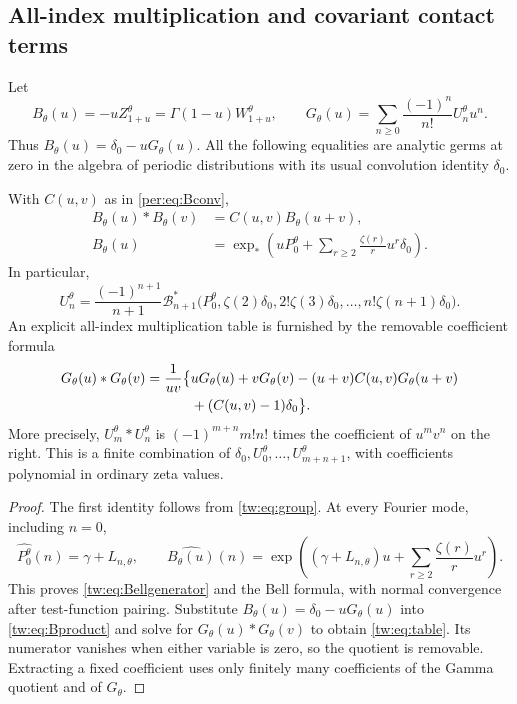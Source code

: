 \subsection{All-index multiplication and covariant contact terms}

Let
\begin{equation}\label{tw:eq:B}
 B_\theta(u)=-uZ_{1+u}^\theta
      =\Gamma(1-u)W_{1+u}^\theta,
 \qquad
 G_\theta(u)=\sum_{n\ge0}\frac{(-1)^n}{n!}U_n^\theta u^n.
\end{equation}
Thus $B_\theta(u)=\delta_0-uG_\theta(u)$. All the following
equalities are analytic germs at zero in the algebra of periodic
distributions with its usual convolution identity $\delta_0$.

\begin{theorem}
\label{tw:thm:normalform}
With $C(u,v)$ as in \eqref{per:eq:Bconv},
\begin{align}
 B_\theta(u)*B_\theta(v)&=C(u,v)B_\theta(u+v),
 \label{tw:eq:Bproduct}\\
 B_\theta(u)&=\exp_*\left(uP_0^\theta+
                \sum_{r\ge2}\frac{\zeta(r)}r u^r\delta_0\right).
 \label{tw:eq:Bellgenerator}
\end{align}
In particular,
\begin{equation}\label{tw:eq:Bell}
 U_n^\theta=\frac{(-1)^{n+1}}{n+1}
 \mathcal B_{n+1}^*
 \bigl(P_0^\theta,\zeta(2)\delta_0,2!\zeta(3)\delta_0,
                            \ldots,n!\zeta(n+1)\delta_0\bigr).
\end{equation}
An explicit all-index multiplication table is furnished by the
removable coefficient formula
\begin{align}
 G_\theta(u)*G_\theta(v)
 =\frac{1}{uv}\bigl\{&uG_\theta(u)+vG_\theta(v)
       -(u+v)C(u,v)G_\theta(u+v)\notag\\
       &+(C(u,v)-1)\delta_0\bigr\}.
 \label{tw:eq:table}
\end{align}
More precisely, $U_m^\theta*U_n^\theta$ is $(-1)^{m+n}m!n!$
times the coefficient of $u^mv^n$ on the right. This is a finite
combination of $\delta_0,U_0^\theta,\ldots,U_{m+n+1}^\theta$,
with coefficients polynomial in ordinary zeta values.
\end{theorem}

\begin{proof}
The first identity follows from \eqref{tw:eq:group}. At every
Fourier mode, including $n=0$,
\[
 \widehat{P_0^\theta}(n)=\gamma+L_{n,\theta},\qquad
 \widehat{B_\theta(u)}(n)
       =\exp\left((\gamma+L_{n,\theta})u+
                         \sum_{r\ge2}\frac{\zeta(r)}r u^r\right).
\]
This proves \eqref{tw:eq:Bellgenerator} and the Bell formula, with
normal convergence after test-function pairing. Substitute
$B_\theta(u)=\delta_0-uG_\theta(u)$ into
\eqref{tw:eq:Bproduct} and solve for
$G_\theta(u)*G_\theta(v)$ to obtain \eqref{tw:eq:table}. Its
numerator vanishes when either variable is zero, so the quotient
is removable. Extracting a fixed coefficient uses only finitely
many coefficients of the Gamma quotient and of $G_\theta$.
\end{proof}

